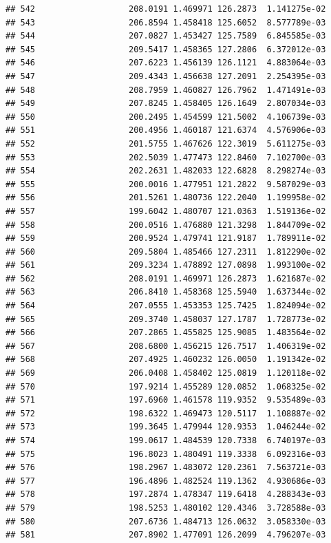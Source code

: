 \documentclass[
]{article}
\begin{document}
\begin{verbatim}
## 542                   208.0191 1.469971 126.2873  1.141275e-02
## 543                   206.8594 1.458418 125.6052  8.577789e-03
## 544                   207.0827 1.453427 125.7589  6.845585e-03
## 545                   209.5417 1.458365 127.2806  6.372012e-03
## 546                   207.6223 1.456139 126.1121  4.883064e-03
## 547                   209.4343 1.456638 127.2091  2.254395e-03
## 548                   208.7959 1.460827 126.7962  1.471491e-03
## 549                   207.8245 1.458405 126.1649  2.807034e-03
## 550                   200.2495 1.454599 121.5002  4.106739e-03
## 551                   200.4956 1.460187 121.6374  4.576906e-03
## 552                   201.5755 1.467626 122.3019  5.611275e-03
## 553                   202.5039 1.477473 122.8460  7.102700e-03
## 554                   202.2631 1.482033 122.6828  8.298274e-03
## 555                   200.0016 1.477951 121.2822  9.587029e-03
## 556                   201.5261 1.480736 122.2040  1.199958e-02
## 557                   199.6042 1.480707 121.0363  1.519136e-02
## 558                   200.0516 1.476880 121.3298  1.844709e-02
## 559                   200.9524 1.479741 121.9187  1.789911e-02
## 560                   209.5804 1.485466 127.2311  1.812290e-02
## 561                   209.3234 1.478892 127.0898  1.993100e-02
## 562                   208.0191 1.469971 126.2873  1.621687e-02
## 563                   206.8410 1.458368 125.5940  1.637344e-02
## 564                   207.0555 1.453353 125.7425  1.824094e-02
## 565                   209.3740 1.458037 127.1787  1.728773e-02
## 566                   207.2865 1.455825 125.9085  1.483564e-02
## 567                   208.6800 1.456215 126.7517  1.406319e-02
## 568                   207.4925 1.460232 126.0050  1.191342e-02
## 569                   206.0408 1.458402 125.0819  1.120118e-02
## 570                   197.9214 1.455289 120.0852  1.068325e-02
## 571                   197.6960 1.461578 119.9352  9.535489e-03
## 572                   198.6322 1.469473 120.5117  1.108887e-02
## 573                   199.3645 1.479944 120.9353  1.046244e-02
## 574                   199.0617 1.484539 120.7338  6.740197e-03
## 575                   196.8023 1.480491 119.3338  6.092316e-03
## 576                   198.2967 1.483072 120.2361  7.563721e-03
## 577                   196.4896 1.482524 119.1362  4.930686e-03
## 578                   197.2874 1.478347 119.6418  4.288343e-03
## 579                   198.5253 1.480102 120.4346  3.728588e-03
## 580                   207.6736 1.484713 126.0632  3.058330e-03
## 581                   207.8902 1.477091 126.2099  4.796207e-03

\end{verbatim}
\end{document}
